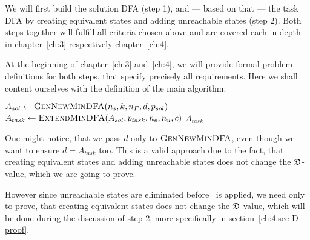 We will first build the solution DFA (step 1), and --- based on that --- the task DFA by creating equivalent states and adding unreachable states (step 2). Both steps together will fulfill all criteria chosen above and are covered each in depth in chapter~\ref{ch:3} respectively chapter~\ref{ch:4}.

At the beginning of chapter~\ref{ch:3} and~\ref{ch:4}, we will provide formal problem definitions for both steps, that specify precisely all requirements. Here we shall content ourselves with the definition of the main algorithm:
\vspace{0.2cm}
\begin{algorithmic}[1]
	\State $A_{sol} \gets \textsc{GenNewMinDFA}({n_s}, k, {n_F}, d, p_{sol})$
	\State $A_{task} \gets \textsc{ExtendMinDFA}(A_{sol}, p_{task}, {n_e}, {n_u}, c)$
	\State \Return $A_{task}$
	\EndFunction
\end{algorithmic}
\vspace{0.2cm}
\noindent One might notice, that we pass $d$ only to $\textsc{GenNewMinDFA}$, even though we want to ensure $d = A_{task}$ too. This is a valid approach due to the fact, that creating equivalent states and adding unreachable states does not change the $\mathfrak{D}$-value, which we are going to prove. 

However since unreachable states are eliminated before \CompDist\ is applied, we need only to prove, that creating equivalent states does not change the $\mathfrak{D}$-value, which will be done during the discussion of step 2, more specifically in section~\ref{ch:4:sec-D-proof}.


